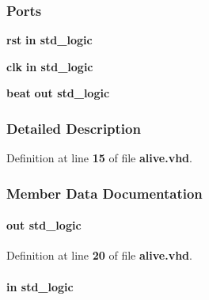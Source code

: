 \subsubsection*{Ports}
 \begin{DoxyCompactItemize}
\item 
{\bf rst}  {\bfseries {\bfseries \textcolor{keywordflow}{in}\textcolor{vhdlchar}{ }}} {\bfseries \textcolor{comment}{std\+\_\+logic}\textcolor{vhdlchar}{ }} 
\item 
{\bf clk}  {\bfseries {\bfseries \textcolor{keywordflow}{in}\textcolor{vhdlchar}{ }}} {\bfseries \textcolor{comment}{std\+\_\+logic}\textcolor{vhdlchar}{ }} 
\item 
{\bf beat}  {\bfseries {\bfseries \textcolor{keywordflow}{out}\textcolor{vhdlchar}{ }}} {\bfseries \textcolor{comment}{std\+\_\+logic}\textcolor{vhdlchar}{ }} 
\end{DoxyCompactItemize}


\subsubsection{Detailed Description}


Definition at line {\bf 15} of file {\bf alive.\+vhd}.



\subsubsection{Member Data Documentation}
\paragraph[{beat}]{ {\bfseries \textcolor{keywordflow}{out}\textcolor{vhdlchar}{ }} {\bfseries \textcolor{comment}{std\+\_\+logic}\textcolor{vhdlchar}{ }} \hspace{0.3cm}{\ttfamily [Port]}}\label{classalive_a3aaa205e44cf14bb9be4032c3f595bda}


Definition at line {\bf 20} of file {\bf alive.\+vhd}.

\paragraph[{clk}]{ {\bfseries \textcolor{keywordflow}{in}\textcolor{vhdlchar}{ }} {\bfseries \textcolor{comment}{std\+\_\+logic}\textcolor{vhdlchar}{ }} \hspace{0.3cm}{\ttfamily [Port]}}\label{classalive_a4a4609c199d30b3adebbeb3a01276ec5}


